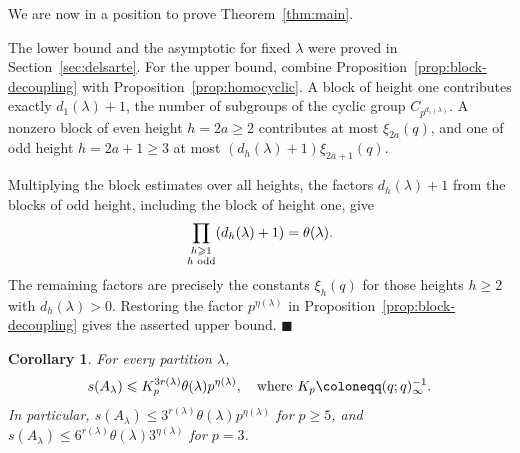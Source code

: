 \documentclass[a4paper,11pt,reqno]{amsart}
\theoremstyle{plain}
\newtheorem{corollary}[theorem]{Corollary}
\theoremstyle{remark}
\numberwithin{equation}{section}
\renewcommand{\leq}{\leqslant}
\renewcommand{\geq}{\geqslant}
\newenvironment{proofof}{{\bf Proof. }}{\hfill $\blacksquare$ \\}
\begin{document}
We are now in a position to prove Theorem~\ref{thm:main}.

\begin{proofof}
The lower bound and the asymptotic for fixed $\lambda$ were proved in
Section~\ref{sec:delsarte}. For the upper bound, combine
Proposition~\ref{prop:block-decoupling} with
Proposition~\ref{prop:homocyclic}. A block of height one contributes exactly
$d_1(\lambda)+1$, the number of subgroups of the cyclic group
$C_{p^{d_1(\lambda)}}$. A nonzero block of even height $h=2a\geq 2$ contributes
at most $\xi_{2a}(q)$, and one of odd height $h=2a+1\geq 3$ at most
$(d_h(\lambda)+1)\xi_{2a+1}(q)$.

Multiplying the block estimates over all heights, the factors
$d_h(\lambda)+1$ from the blocks of odd height, including the block of height one,
give
\[
        \prod_{\substack{h\geq 1\\ h\textnormal{ odd}}}(d_h(\lambda)+1)
        =\theta(\lambda).
\]
The remaining factors are precisely the constants $\xi_h(q)$ for those heights
$h\geq 2$ with $d_h(\lambda)>0$. Restoring the factor $p^{\eta(\lambda)}$ in
Proposition~\ref{prop:block-decoupling} gives the asserted upper bound.
\end{proofof}

\begin{corollary}\label{cor:uniform}
For every partition $\lambda$,
\[
        s(A_\lambda)
        \leq
        K_p^{3r(\lambda)}\theta(\lambda)p^{\eta(\lambda)},
        \quad \textnormal{where } K_p\coloneqq(q;q)_\infty^{-1}.
\]
In particular, $s(A_\lambda)\leq 3^{r(\lambda)}\theta(\lambda)p^{\eta(\lambda)}$
for $p\geq 5$, and
$s(A_\lambda)\leq 6^{r(\lambda)}\theta(\lambda)3^{\eta(\lambda)}$ for $p=3$.
\end{corollary}
\end{document}
